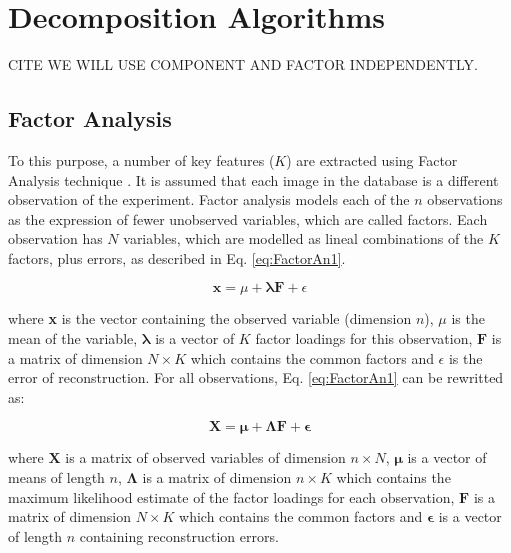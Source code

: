 \section{Decomposition Algorithms}
CITE WE WILL USE COMPONENT AND FACTOR INDEPENDENTLY. 
\subsection{Factor Analysis}
\cite{Martinez201141,Martinez-Murcia20129676}

To this purpose, a number of key features ($K$) are extracted using Fac\-tor A\-na\-ly\-sis technique \cite{Harman73}. It is assumed that each image in the database is a different observation of the experiment. Factor analysis models each of the $n$ observations as the expression of fewer unobserved variables, which are called factors. Each observation has $N$ variables, which are modelled as lineal combinations of the $K$ factors, plus errors, as described in Eq. \ref{eq:FactorAn1}.

\begin{equation}\label{eq:FactorAn1}
\textbf{x} = \mu + \boldsymbol\lambda \textbf{F} + \epsilon
\end{equation}

\noindent where \textbf{x} is the vector containing the observed variable (dimension $n$), $\mu$ is the mean of the variable, $\boldsymbol\lambda$ is a vector of $K$ factor loadings for this observation, $\textbf{F}$ is a matrix of dimension $N \times K$ which contains the common factors and $\epsilon$ is the error of reconstruction. For all observations, Eq. \ref{eq:FactorAn1} can be rewritted as:

\begin{equation}\label{eq:FactorAn2}
\textbf{X} = \boldsymbol\mu + \boldsymbol\Lambda \textbf{F} + \boldsymbol\epsilon
\end{equation}

\noindent where $\textbf{X}$ is a matrix of observed variables of dimension $n \times N$, $\boldsymbol\mu$ is a vector of means of length $n$, $\boldsymbol\Lambda$ is a matrix of dimension $n \times K$ which contains the maximum likelihood estimate of the factor loadings for each observation, $\textbf{F}$ is a matrix of dimension $N \times K$ which contains the common factors and $\boldsymbol\epsilon$ is a vector of length $n$ containing reconstruction errors.

